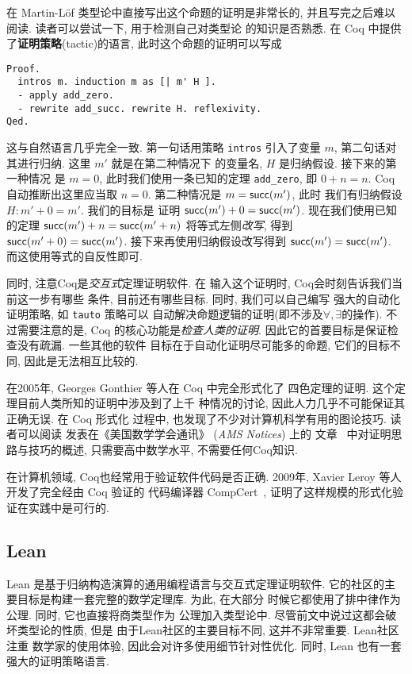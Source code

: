 在 Martin-L\"of 类型论中直接写出这个命题的证明是非常长的,
并且写完之后难以阅读. 读者可以尝试一下, 用于检测自己对类型论
的知识是否熟悉. 在 Coq 中提供了\textbf{证明策略}(tactic)的语言,
此时这个命题的证明可以写成
\begin{verbatim}
Proof.
  intros m. induction m as [| m' H ].
  - apply add_zero.
  - rewrite add_succ. rewrite H. reflexivity.
Qed.
\end{verbatim}
这与自然语言几乎完全一致. 第一句话用策略 \texttt{intros}
引入了变量 \(m\), 第二句话对其进行归纳.
这里 \(m'\) 就是在第二种情况下
的变量名, \(H\) 是归纳假设. 接下来的第一种情况
是 \(m = 0\), 此时我们使用一条已知的定理 \texttt{add\_zero},
即 \(0 + n = n\). Coq 自动推断出这里应当取 \(n = 0\).
第二种情况是 \(m = \textsf{succ}(m')\), 此时
我们有归纳假设 \(H : m' + 0 = m'\). 我们的目标是
证明 \(\textsf{succ}(m') + 0 = \textsf{succ}(m')\).
现在我们使用已知的定理 \(\textsf{succ}(m') + n = \textsf{succ}(m'+n)\)
将等式左侧\emph{改写}, 得到
\(\textsf{succ}(m' + 0) = \textsf{succ}(m')\).
接下来再使用归纳假设改写得到 \(\textsf{succ}(m') = \textsf{succ}(m')\).
而这使用等式的自反性即可.

同时, 注意Coq是\emph{交互式}定理证明软件. 在
输入这个证明时, Coq会时刻告诉我们当前这一步有哪些
条件, 目前还有哪些目标. 同时, 我们可以自己编写
强大的自动化证明策略, 如 \texttt{tauto} 策略可以
自动解决命题逻辑的证明(即不涉及\(\forall, \exists\)的操作).
不过需要注意的是, Coq 的核心功能是\emph{检查人类的证明}.
因此它的首要目标是保证检查没有疏漏. 一些其他的软件
目标在于自动化证明尽可能多的命题, 它们的目标不同,
因此是无法相互比较的.

在2005年, Georges Gonthier 等人在 Coq 中完全形式化了
四色定理的证明. 这个定理目前人类所知的证明中涉及到了上千
种情况的讨论, 因此人力几乎不可能保证其正确无误. 在 Coq 形式化
过程中, 也发现了不少对计算机科学有用的图论技巧. 读者可以阅读
发表在《美国数学学会通讯》 (\emph{AMS Notices}) 上的
文章~\cite{gonthier:2008:fourcolor} 中对证明思路与技巧的概述,
只需要高中数学水平, 不需要任何Coq知识.

在计算机领域, Coq也经常用于验证软件代码是否正确.
2009年, Xavier Leroy 等人开发了完全经由 Coq 验证的
代码编译器 CompCert~\cite{leroy:2009:compcert},
证明了这样规模的形式化验证在实践中是可行的.

\subsection{Lean}

Lean 是基于归纳构造演算的通用编程语言与交互式定理证明软件.
它的社区的主要目标是构建一套完整的数学定理库. 为此, 在大部分
时候它都使用了排中律作为公理. 同时, 它也直接将商类型作为
公理加入类型论中. 尽管前文中说过这都会破坏类型论的性质, 但是
由于Lean社区的主要目标不同, 这并不非常重要. Lean社区注重
数学家的使用体验, 因此会对许多使用细节针对性优化. 同时, Lean 也有一套
强大的证明策略语言.

